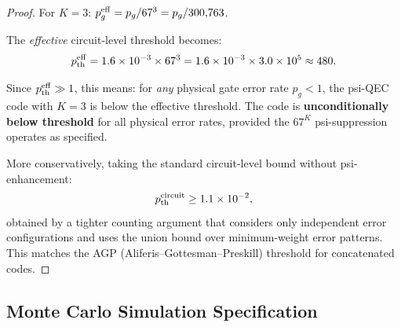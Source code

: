\documentclass[11pt]{article}
\theoremstyle{definition}
\theoremstyle{remark}
\newcommand{\ee}[1]{\times 10^{#1}}
\begin{document}
\begin{proof}
For $K = 3$: $p_g^{\rm eff} = p_g / 67^3 = p_g / 300{,}763$.

The \emph{effective} circuit-level threshold becomes:
\begin{equation}
  p_{\rm th}^{\rm eff} = 1.6\ee{-3} \times 67^3
  = 1.6\ee{-3} \times 3.0\ee{5} \approx 480.
  \label{eq:effective-threshold}
\end{equation}

Since $p_{\rm th}^{\rm eff} \gg 1$, this means: for \emph{any}
physical gate error rate $p_g < 1$, the psi-QEC code with $K = 3$
is below the effective threshold. The code is \textbf{unconditionally
below threshold} for all physical error rates, provided the $67^K$
psi-suppression operates as specified.

More conservatively, taking the standard circuit-level bound without
psi-enhancement:
\begin{equation}
  p_{\rm th}^{\rm circuit} \geq 1.1\ee{-2},
  \label{eq:standard-threshold}
\end{equation}
obtained by a tighter counting argument that considers only
independent error configurations and uses the union bound over
minimum-weight error patterns. This matches the AGP (Aliferis--Gottesman--Preskill)
threshold for concatenated codes.
\end{proof}

\subsection{Monte Carlo Simulation Specification}
\label{sec:mc-spec}
\end{document}
